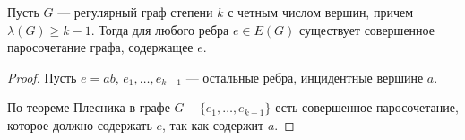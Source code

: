 \begin{corollary}\label{cor:matching_2}
    Пусть $G$ --- регулярный граф степени $k$ с четным числом вершин, причем  $\lambda(G) \ge k-1$. Тогда для любого ребра $e \in E(G)$ существует совершенное паросочетание графа, содержащее $e$.
\end{corollary}
\begin{proof}
    Пусть $e = ab$, $e_1, \ldots , e_{k-1}$ --- остальные ребра, инцидентные вершине $a$.

	По теореме Плесника в графе $G - \{e_1, \ldots , e_{k-1}\}$ есть совершенное паросочетание, которое должно содержать $e$, так как содержит $a$.
\end{proof}
